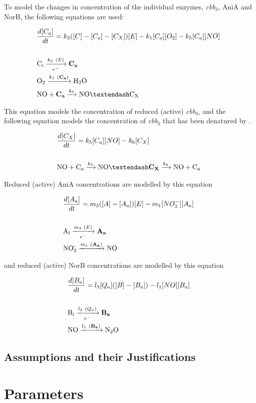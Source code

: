 To model the changes in concentration of the individual enzymes, \textit{cbb$_{\textrm{3}}$}, AniA and NorB, the following equations are used:

\begin{eqnarray}
&\frac{d[C_a]}{dt} = k_3([C] - [C_a] - [C_X])[E] - k_{1}[C_a][O_2] - k_5[C_a][NO] \nonumber \\\nonumber \\
&\textnormal{C$_\textnormal{i}$} \xrightarrow[e^-]{k_3~(E)} \bold{C_a} \nonumber \\
&\textnormal{O$_\textnormal{2}$} \xrightarrow{k_1~(\bold{C_a})} \textnormal{H$_\textnormal{2}$O} \nonumber \\
&\textnormal{NO} + \bold{C_a} \xrightarrow{k_5} \textnormal{NO}\textendash \textnormal{C$_\textnormal{X}$}
\label{eq:active_cbb3}
\end{eqnarray}

This equation models the concentration of reduced (active) \textit{cbb$_{\textrm{3}}$}, and the following equation models the concentration of \textit{cbb$_{\textrm{3}}$} that has been denatured by \cNO.

\begin{eqnarray}
&\frac{d[C_X]}{dt} = k_5[C_a][NO] - k_6 [C_X] \nonumber \\\nonumber \\
&\textnormal{NO} + \textnormal{C$_\textnormal{a}$} \xrightarrow{k_5} \textnormal{NO}\textendash \bold{C_X} \xrightarrow{k_6} \textnormal{NO} + \textnormal{C$_\textnormal{a}$}
\label{eq:denatured_cbb3}
\end{eqnarray}

Reduced (active) AniA concentrations are modelled by this equation

\begin{eqnarray}
&\frac{d[A_a]}{dt} = m_3([A] - [A_a])[E]- m_{1}[NO_2^-][A_a] \nonumber \\\nonumber \\
&\textnormal{A$_\textnormal{i}$} \xrightarrow[e^-]{m_3~(E)} \bold{A_a} \nonumber \\
&\textnormal{NO$_\textnormal{2}^\textnormal{-}$} \xrightarrow{m_1~(\bold{A_a})} \textnormal{NO}
\label{eq:active_ania}
\end{eqnarray}

and reduced (active) NorB concentrations are modelled by this equation

\begin{eqnarray}
&\frac{d[B_a]}{dt} = l_3[Q_a]([B] - [B_a]) - l_1[NO][B_a] \nonumber \\\nonumber \\
&\textnormal{B$_\textnormal{i}$} \xrightarrow[e^-]{l_3~(Q_a)} \bold{B_a} \nonumber \\
&\textnormal{NO} \xrightarrow{l_1~(\bold{B_a})} \textnormal{N$_\textnormal{2}$O}
\label{eq:active_norb}
\end{eqnarray}

\subsection{Assumptions and their Justifications}
\section{Parameters}